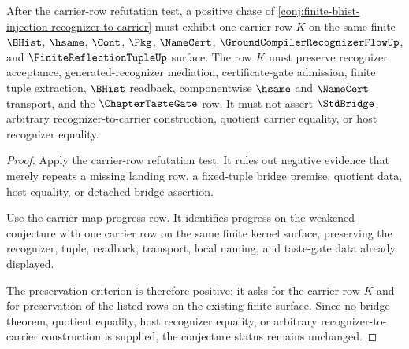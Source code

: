 \begin{theorem}
\label{thm:finite-bhist-injection-carrier-row-preservation-criterion}
After the carrier-row refutation test, a positive chase of \autoref{conj:finite-bhist-injection-recognizer-to-carrier} must exhibit one carrier row $K$ on the same finite $\BHist$, $\hsame$, $\Cont$, $\Pkg$, $\NameCert$, $\GroundCompilerRecognizerFlowUp$, and $\FiniteReflectionTupleUp$ surface. The row $K$ must preserve recognizer acceptance, generated-recognizer mediation, certificate-gate admission, finite tuple extraction, $\BHist$ readback, componentwise $\hsame$ and $\NameCert$ transport, and the $\ChapterTasteGate$ row. It must not assert $\StdBridge$, arbitrary recognizer-to-carrier construction, quotient carrier equality, or host recognizer equality.
\end{theorem}
\begin{proof}
Apply the carrier-row refutation test. It rules out negative evidence that merely repeats a missing landing row, a fixed-tuple bridge premise, quotient data, host equality, or detached bridge assertion.

Use the carrier-map progress row. It identifies progress on the weakened conjecture with one carrier row on the same finite kernel surface, preserving the recognizer, tuple, readback, transport, local naming, and taste-gate data already displayed.

The preservation criterion is therefore positive: it asks for the carrier row $K$ and for preservation of the listed rows on the existing finite surface. Since no bridge theorem, quotient equality, host recognizer equality, or arbitrary recognizer-to-carrier construction is supplied, the conjecture status remains unchanged.
\end{proof}

